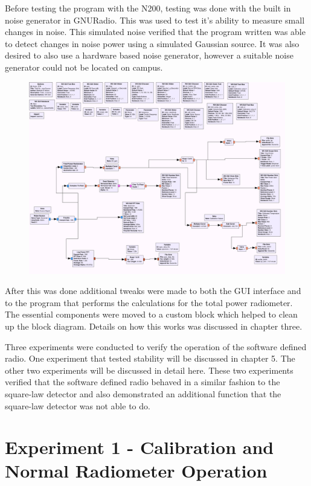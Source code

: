 Before testing the program with the N200, testing was done with the built in noise generator in GNURadio.  This was used to test it's ability to measure small changes in noise.  This simulated noise verified that the program written was able to detect changes in noise power using a simulated Gaussian source.  It was also desired to also use a hardware based noise generator, however a suitable noise generator could not be located on campus.

{\begin{figure}[h!tb] \centering
\includegraphics[width=\textwidth]{Images/noisesrc_radiometer.png}
\label{noise_test}
\end{figure}
}

After this was done additional tweaks were made to both the GUI interface and to the program that performs the calculations for the total power radiometer.  The essential components were moved to a custom block which helped to clean up the block diagram.  Details on how this works was discussed in chapter three.

Three experiments were conducted to verify the operation of the software defined radio.  One experiment that tested stability will be discussed in chapter 5.  The other two experiments will be discussed in detail here.  These two experiments verified that the software defined radio behaved in a similar fashion to the square-law detector and also demonstrated an additional function that the square-law detector was not able to do.

\section{Experiment 1 - Calibration and Normal Radiometer Operation}

